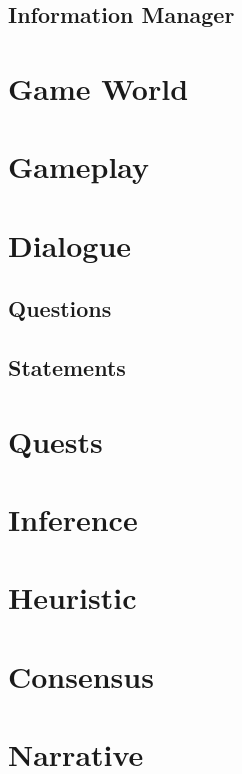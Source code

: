\subsection{Information Manager}
\section{Game World}
\section{Gameplay}
\section{Dialogue}
\subsection{Questions}
\subsection{Statements}
\section{Quests}
\section{Inference}
\section{Heuristic}
\section{Consensus}
\section{Narrative}
